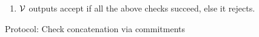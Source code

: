\begin{figure}[htbp]
\begin{mdframed}
{\begin{enumerate}[leftmargin=1em, label=\arabic*.]
            \begin{itemize}[leftmargin=1em]
                \item $\kzgverify(\srs,\gone{v},\vec{p}_v, \vec{e}_v, \Pi_v)$ where
                $\vec{p}_v$ = $(s,\omega^m s, \omega^{2m}s)$ and $\vec{e}_v$ = $(\val{s}{v}, \val{\omega^m s}{v}, \val{\omega^{2m} s}{v})$.
                \item $\kzgverify(\srs,\gone{h}, s^3, \val{s^3}{h},\Pi_h)$.
                \item $\kzgverify(\srs,\gone{f}, s, \val{s}{Z} + r\val{s}{Q}, \Pi_f)$.
                \item $\val{s}{Q}\cdot \val{s}{Z} =? \val{s^3}{h}-\val{s}{v}-\gamma \val{\omega^m s}{v}-\gamma^2\val{\omega^{2m}s}{v}$.
            \end{itemize}
            \item $\mathcal{V}$ outputs accept if all the above checks succeed, else it rejects.
        \end{enumerate}
    }
    \end{mdframed}
    \caption{Protocol: Check concatenation via commitments}
    \label{fig:concatenation}
\end{figure}

